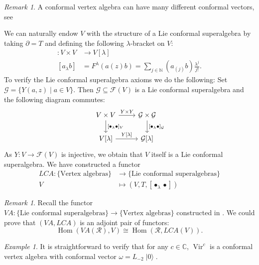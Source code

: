 \documentclass[a4paper, 12pt, reqno]{amsart}
\theoremstyle{remark}
\newtheorem{remark}[theorem]{Remark}
\newtheorem{example}[theorem]{Example}
\numberwithin{equation}{subsection}
\DeclareMathOperator{\Vir}{Vir}
\DeclareMathOperator{\vac}{|0\rangle}
\DeclareMathOperator{\Hom}{Hom}
\begin{document}
\begin{remark}
  \label{rmk:16}
  A conformal vertex algebra can have many different conformal vectors, see \cite[2.5.9. Examples.]{frenkel_vertex_2001}
\end{remark}

We can naturally endow $V$ with the structure of a Lie conformal superalgebra by taking $\partial = T$ and defining the following $\lambda$-bracket on $V$:
\begin{align*}
  [\bullet_{\lambda}\bullet]: V \times V &\to V[\lambda] \\
  [a_{\lambda}b] &= F^{\lambda}(a(z)b) = \sum_{j \in \mathbb{N}}(a_{(j)}b)\frac{\lambda^j}{j!}.
\end{align*}
To verify the Lie conformal superalgebra axioms we do the following:
Set $\mathcal{G}=\{Y(a,z)\mid a\in V\}$.
Then $\mathcal{G}\subseteq \mathcal{F}(V)$ is a Lie conformal superalgebra and the following diagram commutes:
\begin{equation*}
  \begin{tikzcd}
    V\times V \arrow[d, "{[\bullet_{\lambda}\bullet]_V}"] \arrow[r, "Y\times Y"] & \mathcal{G}\times\mathcal{G} \arrow[d, "{[\bullet_{\lambda}\bullet]_{\mathcal{G}}}"] \\
    {V[\lambda]} \arrow[r, "{Y[\lambda]}"]                       & {\mathcal{G}[\lambda]}                                                 
  \end{tikzcd}
\end{equation*}
As $Y: V \to \mathcal{F}(V)$ is injective, we obtain that $V$ itself is a Lie conformal superalgebra.
We have constructed a functor
\begin{align*}
  LCA: \{\text{Vertex algebras}\} &\to \{\text{Lie conformal superalgebras}\} \\
  V &\mapsto (V, T, [\bullet_{\lambda}\bullet])
\end{align*}

\begin{remark}
  \label{rmk:17}
  Recall the functor $VA: \{\text{Lie conformal superalgebras}\} \to \{\text{Vertex algebras}\}$ constructed in .
  We could prove that $(VA, LCA)$ is an adjoint pair of functors:
  \begin{equation*}
    \Hom(VA(\mathcal{R}), V) \cong \Hom(\mathcal{R}, LCA(V)).
  \end{equation*}
\end{remark}

\begin{example}
  \label{exa:8}
  It is straightforward to verify that for any $c \in \mathbb{C}$, $\Vir^c$ is a conformal vertex algebra with conformal vector $\omega = L_{-2}\vac$.
\end{example}
\end{document}

